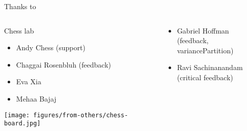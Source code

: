 \documentclass{beamer}
\begin{document}
\begin{frame}[label=chess-lab]{Thanks to}
\begin{columns}[t]
\begin{column}{0.5\textwidth}

Chess lab
\begin{itemize}
\item Andy Chess {\footnotesize (support)}
\item Chaggai Rosenbluh {\footnotesize (feedback)}
\item Eva Xia
\item Mehaa Bajaj   
\end{itemize}

\texttt{[image: figures/from-others/chess-board.jpg]}
\end{column}

\begin{column}{0.5\textwidth}
\begin{itemize}
\item Gabriel Hoffman\\
{\footnotesize (feedback, variancePartition)}
\item Ravi Sachinanandam\\
{\footnotesize (critical feedback)}
\end{itemize}
\end{column}
\end{columns}
\end{frame}
\end{document}
